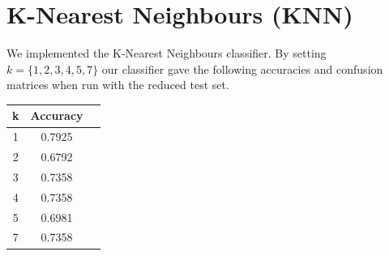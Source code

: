 \documentclass[11pt]{article}
\begin{document}
\section{K-Nearest Neighbours (KNN)}
We implemented the K-Nearest Neighbours classifier. By setting $k = \{1,2,3,4,5,7\}$ our classifier gave the following accuracies and confusion matrices when run with the reduced test set.

\begin{center}
\begin{tabular}{c|c|c}
\textbf{k} & \textbf{Accuracy}\\
\hline
1 & 0.7925\\
2 & 0.6792\\
3 & 0.7358\\
4 & 0.7358\\
5 & 0.6981\\
7 & 0.7358\\
\end{tabular}
\end{center}
\end{document}
